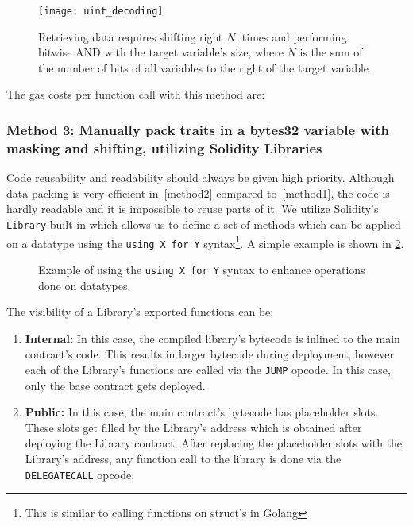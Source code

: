 \begin{figure}[H]
    \centering
    \texttt{[image: uint\_decoding]}
    \caption{Retrieving data requires shifting right $N$: times and performing bitwise AND with the target variable's size, where $N$ is the sum of the number of bits of all variables to the right of the target variable.}
    \label{fig:uint_decoding}
\end{figure}

The gas costs per function call with this method are: 


\subsubsection{Method 3: Manually pack traits in a bytes32 variable with masking and shifting, utilizing Solidity Libraries} \label{method3}

Code reusability and readability should always be given high priority. Although data packing is very efficient in~\ref{method2} compared to~\ref{method1}, the code is hardly readable and it is impossible to reuse parts of it. %
We utilize Solidity's \texttt{Library} built-in which allows us to define a set of methods which can be applied on a datatype using the \texttt{using X for Y} syntax\footnote{This is similar to calling functions on struct's in Golang}. A simple example is shown in \ref{fig:library}.

\begin{figure}[ht!]
    \centering
    
    \caption{Example of using the \texttt{using X for Y} syntax to enhance operations done on datatypes.}
    \label{fig:library}
\end{figure}

The visibility of a Library's exported functions can be: 
\begin{enumerate}
    \item \textbf{Internal:}
        In this case, the compiled library's bytecode is inlined to the main contract's code. This results in larger bytecode during deployment, however each of the Library's functions are called via the \texttt{JUMP} opcode. In this case, only the base contract gets deployed.
    \item \textbf{Public:}
        In this case, the main contract's bytecode has placeholder slots. These slots get filled by the Library's address which is obtained after deploying the Library contract. After replacing the placeholder slots with the Library's address, any function call to the library is done via the \texttt{DELEGATECALL} opcode.
\end{enumerate}

